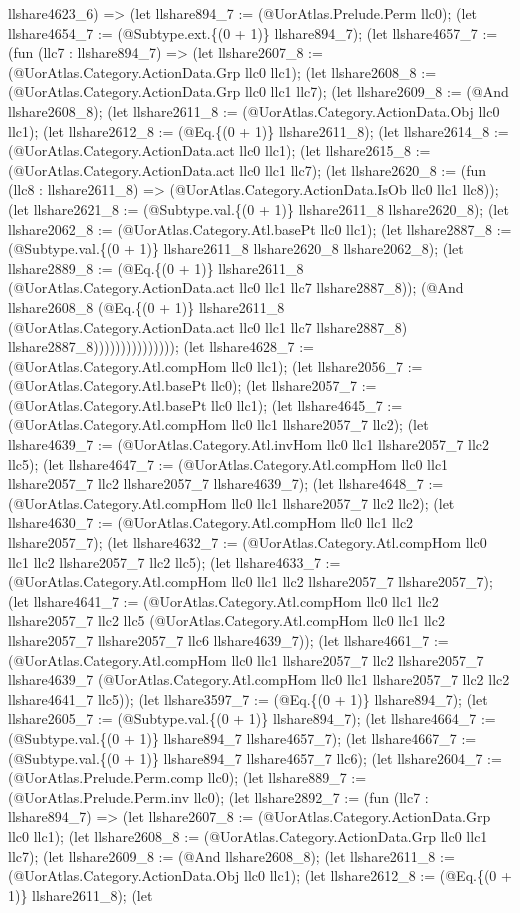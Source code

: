\documentclass[11pt]{article}
\begin{document}
llshare4623\_6) => (let llshare894\_7 := (@UorAtlas.Prelude.Perm llc0); (let llshare4654\_7 := (@Subtype.ext.\{(0 + 1)\} llshare894\_7); (let llshare4657\_7 := (fun (llc7 : llshare894\_7) => (let llshare2607\_8 := (@UorAtlas.Category.ActionData.Grp llc0 llc1); (let llshare2608\_8 := (@UorAtlas.Category.ActionData.Grp llc0 llc1 llc7); (let llshare2609\_8 := (@And llshare2608\_8); (let llshare2611\_8 := (@UorAtlas.Category.ActionData.Obj llc0 llc1); (let llshare2612\_8 := (@Eq.\{(0 + 1)\} llshare2611\_8); (let llshare2614\_8 := (@UorAtlas.Category.ActionData.act llc0 llc1); (let llshare2615\_8 := (@UorAtlas.Category.ActionData.act llc0 llc1 llc7); (let llshare2620\_8 := (fun (llc8 : llshare2611\_8) => (@UorAtlas.Category.ActionData.IsOb llc0 llc1 llc8)); (let llshare2621\_8 := (@Subtype.val.\{(0 + 1)\} llshare2611\_8 llshare2620\_8); (let llshare2062\_8 := (@UorAtlas.Category.Atl.basePt llc0 llc1); (let llshare2887\_8 := (@Subtype.val.\{(0 + 1)\} llshare2611\_8 llshare2620\_8 llshare2062\_8); (let llshare2889\_8 := (@Eq.\{(0 + 1)\} llshare2611\_8 (@UorAtlas.Category.ActionData.act llc0 llc1 llc7 llshare2887\_8)); (@And llshare2608\_8 (@Eq.\{(0 + 1)\} llshare2611\_8 (@UorAtlas.Category.ActionData.act llc0 llc1 llc7 llshare2887\_8) llshare2887\_8))))))))))))))); (let llshare4628\_7 := (@UorAtlas.Category.Atl.compHom llc0 llc1); (let llshare2056\_7 := (@UorAtlas.Category.Atl.basePt llc0); (let llshare2057\_7 := (@UorAtlas.Category.Atl.basePt llc0 llc1); (let llshare4645\_7 := (@UorAtlas.Category.Atl.compHom llc0 llc1 llshare2057\_7 llc2); (let llshare4639\_7 := (@UorAtlas.Category.Atl.invHom llc0 llc1 llshare2057\_7 llc2 llc5); (let llshare4647\_7 := (@UorAtlas.Category.Atl.compHom llc0 llc1 llshare2057\_7 llc2 llshare2057\_7 llshare4639\_7); (let llshare4648\_7 := (@UorAtlas.Category.Atl.compHom llc0 llc1 llshare2057\_7 llc2 llc2); (let llshare4630\_7 := (@UorAtlas.Category.Atl.compHom llc0 llc1 llc2 llshare2057\_7); (let llshare4632\_7 := (@UorAtlas.Category.Atl.compHom llc0 llc1 llc2 llshare2057\_7 llc2 llc5); (let llshare4633\_7 := (@UorAtlas.Category.Atl.compHom llc0 llc1 llc2 llshare2057\_7 llshare2057\_7); (let llshare4641\_7 := (@UorAtlas.Category.Atl.compHom llc0 llc1 llc2 llshare2057\_7 llc2 llc5 (@UorAtlas.Category.Atl.compHom llc0 llc1 llc2 llshare2057\_7 llshare2057\_7 llc6 llshare4639\_7)); (let llshare4661\_7 := (@UorAtlas.Category.Atl.compHom llc0 llc1 llshare2057\_7 llc2 llshare2057\_7 llshare4639\_7 (@UorAtlas.Category.Atl.compHom llc0 llc1 llshare2057\_7 llc2 llc2 llshare4641\_7 llc5)); (let llshare3597\_7 := (@Eq.\{(0 + 1)\} llshare894\_7); (let llshare2605\_7 := (@Subtype.val.\{(0 + 1)\} llshare894\_7); (let llshare4664\_7 := (@Subtype.val.\{(0 + 1)\} llshare894\_7 llshare4657\_7); (let llshare4667\_7 := (@Subtype.val.\{(0 + 1)\} llshare894\_7 llshare4657\_7 llc6); (let llshare2604\_7 := (@UorAtlas.Prelude.Perm.comp llc0); (let llshare889\_7 := (@UorAtlas.Prelude.Perm.inv llc0); (let llshare2892\_7 := (fun (llc7 : llshare894\_7) => (let llshare2607\_8 := (@UorAtlas.Category.ActionData.Grp llc0 llc1); (let llshare2608\_8 := (@UorAtlas.Category.ActionData.Grp llc0 llc1 llc7); (let llshare2609\_8 := (@And llshare2608\_8); (let llshare2611\_8 := (@UorAtlas.Category.ActionData.Obj llc0 llc1); (let llshare2612\_8 := (@Eq.\{(0 + 1)\} llshare2611\_8); (let 
\end{document}
